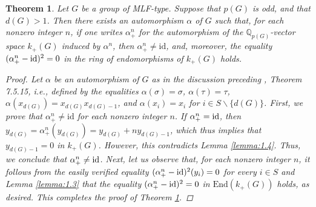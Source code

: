 \documentclass[12pt,showkeys]{amsart}
\theoremstyle{theorem}
\newtheorem{theorem}{Theorem}[section]
\theoremstyle{definition}
\def\End{{\mbox{End}}}
\begin{document}
\begin{theorem}\label{theorem:1.5}
 Let $G$ be a group of MLF-type.  Suppose that $p(G)$ is odd, and that $d(G) > 1$.  Then there exists an automorphism $\alpha$ of $G$ such that, for each nonzero integer $n$, if one writes $\alpha^n_+$ for the automorphism of the $\mathbb{Q}_{p(G)}$-vector space $k_+(G)$ induced by $\alpha^n$, then $\alpha^n_+ \neq \mathrm{id}$, and, moreover, the equality $(\alpha^n_{+}- {\rm id})^2 = 0$ in the ring of endomorphisms of $k_+(G)$ holds.  
\begin{proof} 
Let $\alpha$ be an automorphism of $G$ as in the discussion preceding \cite{NSW}, Theorem 7.5.15, i.e., defined by the equalities $\alpha(\sigma) = \sigma$, $\alpha(\tau) = \tau$, $\alpha(x_{d(G)}) = x_{d(G)} x_{d(G)-1}$, and $\alpha(x_i) = x_i$ for $i\in S \backslash \{d(G)\}$. First, we prove that $\alpha_+^n \neq \mathrm{id}$ for each nonzero integer $n$. If $\alpha_+^n = {\rm id}$, then $y_{d(G)} = \alpha^n_+(y_{d(G)}) = y_{d(G)} + ny_{d(G)-1}$, which thus implies that $y_{d(G)-1} = 0$ in $k_{+}(G)$. However, this contradicts Lemma \ref{lemma:1.4}. Thus, we conclude that $\alpha_+^n \neq {\rm id}$. Next, let us observe that, for each nonzero integer $n$, it follows from the easily verified equality $(\alpha^n_+ - {\rm id})^2 (y_i) = 0$ for every $i \in S$ and Lemma \ref{lemma:1.3} that the equality $(\alpha^n_+- {\rm id})^2 = 0$ in $\End(k_+(G))$ holds, as desired. This completes the proof of Theorem \ref{theorem:1.5}. 
\end{proof}
\end{theorem}
\end{document}
